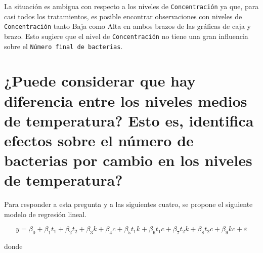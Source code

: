 \documentclass[10pt, spanish]{article}
\begin{document}
La situación es ambigua con respecto a los niveles de
\texttt{Concentración} ya que, para casi todos los tratamientos, es
posible encontrar observaciones con niveles de \texttt{Concentración}
tanto Baja como Alta en ambos brazos de las gráficas de caja y brazo.
Esto sugiere que el nivel de \texttt{Concentración} no tiene una gran
influencia sobre el \texttt{Número\ final\ de\ bacterias}.

    \hypertarget{puede-considerar-que-hay-diferencia-entre-los-niveles-medios-de-temperatura-esto-es-identifica-efectos-sobre-el-nuxfamero-de-bacterias-por-cambio-en-los-niveles-de-temperatura}{%
\section{¿Puede considerar que hay diferencia entre los niveles medios
de temperatura? Esto es, identifica efectos sobre el número de bacterias
por cambio en los niveles de
temperatura?}\label{puede-considerar-que-hay-diferencia-entre-los-niveles-medios-de-temperatura-esto-es-identifica-efectos-sobre-el-nuxfamero-de-bacterias-por-cambio-en-los-niveles-de-temperatura}}

    Para responder a esta pregunta y a las siguientes cuatro, se propone el
siguiente modelo de regresión lineal.

    \[y = \beta_0 + \beta_1t_1 + \beta_2t_2 + \beta_3k + \beta_4c + \beta_5t_1k + \beta_6t_1c + \beta_7t_2k + \beta_8t_2c + \beta_9kc + \varepsilon\]

donde
\end{document}
